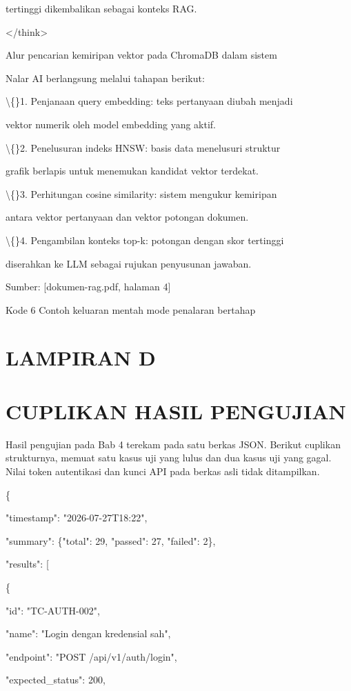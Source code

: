 \documentclass[12pt,a4paper]{article}
\begin{document}
tertinggi dikembalikan sebagai konteks RAG.

\textless{}/think\textgreater{}

Alur pencarian kemiripan vektor pada ChromaDB dalam sistem

Nalar AI berlangsung melalui tahapan berikut:

\textbackslash\{\}1. Penjanaan query embedding: teks pertanyaan diubah menjadi

vektor numerik oleh model embedding yang aktif.

\textbackslash\{\}2. Penelusuran indeks HNSW: basis data menelusuri struktur

grafik berlapis untuk menemukan kandidat vektor terdekat.

\textbackslash\{\}3. Perhitungan cosine similarity: sistem mengukur kemiripan

antara vektor pertanyaan dan vektor potongan dokumen.

\textbackslash\{\}4. Pengambilan konteks top-k: potongan dengan skor tertinggi

diserahkan ke LLM sebagai rujukan penyusunan jawaban.

Sumber: {[}dokumen-rag.pdf, halaman 4{]}

Kode 6	Contoh keluaran mentah mode penalaran bertahap

\section*{LAMPIRAN D}
\section*{CUPLIKAN HASIL PENGUJIAN}
Hasil pengujian pada Bab 4 terekam pada satu berkas JSON. Berikut cuplikan strukturnya, memuat satu kasus uji yang lulus dan dua kasus uji yang gagal. Nilai token autentikasi dan kunci API pada berkas asli tidak ditampilkan.

\{

"timestamp": "2026-07-27T18:22",

"summary": \{"total": 29, "passed": 27, "failed": 2\},

"results": {[}

\{

"id": "TC-AUTH-002",

"name": "Login dengan kredensial sah",

"endpoint": "POST /api/v1/auth/login",

"expected\_status": 200,
\end{document}
